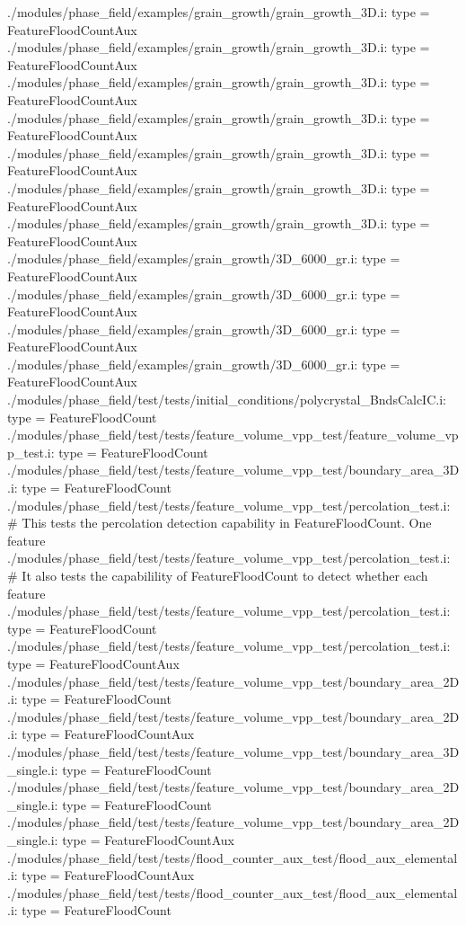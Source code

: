 ./modules/phase_field/examples/grain_growth/grain_growth_3D.i:    type = FeatureFloodCountAux
./modules/phase_field/examples/grain_growth/grain_growth_3D.i:    type = FeatureFloodCountAux
./modules/phase_field/examples/grain_growth/grain_growth_3D.i:    type = FeatureFloodCountAux
./modules/phase_field/examples/grain_growth/grain_growth_3D.i:    type = FeatureFloodCountAux
./modules/phase_field/examples/grain_growth/grain_growth_3D.i:    type = FeatureFloodCountAux
./modules/phase_field/examples/grain_growth/grain_growth_3D.i:    type = FeatureFloodCountAux
./modules/phase_field/examples/grain_growth/grain_growth_3D.i:    type = FeatureFloodCountAux
./modules/phase_field/examples/grain_growth/3D_6000_gr.i:    type = FeatureFloodCountAux
./modules/phase_field/examples/grain_growth/3D_6000_gr.i:    type = FeatureFloodCountAux
./modules/phase_field/examples/grain_growth/3D_6000_gr.i:    type = FeatureFloodCountAux
./modules/phase_field/examples/grain_growth/3D_6000_gr.i:    type = FeatureFloodCountAux
./modules/phase_field/test/tests/initial_conditions/polycrystal_BndsCalcIC.i:    type = FeatureFloodCount
./modules/phase_field/test/tests/feature_volume_vpp_test/feature_volume_vpp_test.i:    type = FeatureFloodCount
./modules/phase_field/test/tests/feature_volume_vpp_test/boundary_area_3D.i:    type = FeatureFloodCount
./modules/phase_field/test/tests/feature_volume_vpp_test/percolation_test.i:# This tests the percolation detection capability in FeatureFloodCount. One feature
./modules/phase_field/test/tests/feature_volume_vpp_test/percolation_test.i:# It also tests the capabilility of FeatureFloodCount to detect whether each feature
./modules/phase_field/test/tests/feature_volume_vpp_test/percolation_test.i:    type = FeatureFloodCount
./modules/phase_field/test/tests/feature_volume_vpp_test/percolation_test.i:    type = FeatureFloodCountAux
./modules/phase_field/test/tests/feature_volume_vpp_test/boundary_area_2D.i:    type = FeatureFloodCount
./modules/phase_field/test/tests/feature_volume_vpp_test/boundary_area_2D.i:    type = FeatureFloodCountAux
./modules/phase_field/test/tests/feature_volume_vpp_test/boundary_area_3D_single.i:    type = FeatureFloodCount
./modules/phase_field/test/tests/feature_volume_vpp_test/boundary_area_2D_single.i:    type = FeatureFloodCount
./modules/phase_field/test/tests/feature_volume_vpp_test/boundary_area_2D_single.i:    type = FeatureFloodCountAux
./modules/phase_field/test/tests/flood_counter_aux_test/flood_aux_elemental.i:    type = FeatureFloodCountAux
./modules/phase_field/test/tests/flood_counter_aux_test/flood_aux_elemental.i:    type = FeatureFloodCount
